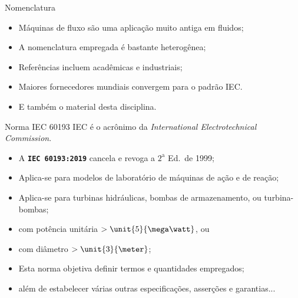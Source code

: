     \begin{frame}{Nomenclatura}\vspace*{-1em}
        \begin{itemize}
            \item<1-> Máquinas de fluxo são uma \alert{aplicação muito antiga} em fluidos;
            \item<1-> A \alert{nomenclatura} empregada é \alert{bastante heterogênea};
            \item<2-> Referências incluem \alert{acadêmicas} e \alert{industriais};
            \item<2-> \alert{Maiores fornecedores mundiais} convergem para o \alert{padrão IEC}.
            \item<3-> E também o material desta disciplina.
        \end{itemize}
    \end{frame}

    \begin{frame}{Norma IEC 60193}\vspace*{-1em}
        IEC é o acrônimo da \textit{International Electrotechnical Commission\/}.
        \vspace*{\medskipamount}

        \begin{itemize}
            \item<1-> A \alert{\textbf{\texttt{IEC 60193:2019}}} cancela e revoga a
                $2^{\mathrm{a}}$ Ed.~de 1999;
            \item<1-> Aplica-se para \alert{modelos de laboratório} de máquinas de \alert{ação}
                e de \alert{reação};
            \item<1-> Aplica-se para \alert{turbinas hidráulicas}, \alert{bombas de
                armazenamento}, ou \alert{turbina-bombas};
            \item<2-> com \alert{potência unitária $> \unit{5}{\mega\watt}$}, ou
            \item<2-> com \alert{diâmetro $> \unit{3}{\meter}$};
            \item<3-> Esta norma objetiva \alert{definir termos e quantidades} empregados;
            \item<3-> além de estabelecer várias outras \alert{especificações},
                \alert{asserções} e \alert{garantias}...
        \end{itemize}
    \end{frame}

